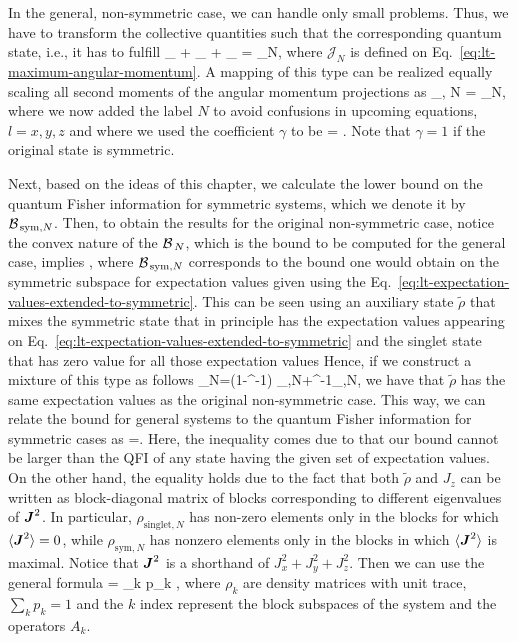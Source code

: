 In the general, non-symmetric case, we can handle only small problems.
Thus, we have to transform the collective quantities such that the corresponding quantum state, i.e., it has to fulfill
\be
  _{} + _{} + _{} = _N,
\ee
where $\mathcal{J}_{N}$ is defined on Eq.~\eqref{eq:lt-maximum-angular-momentum}.
A mapping of this type can be realized equally scaling all second moments of the angular momentum projections as
\be
  \label{eq:lt-expectation-values-extended-to-symmetric}
  _{, N} = \gamma {}_N,
\ee
where we now added the label $N$ to avoid confusions in upcoming equations, $l=x,y,z$ and where we used the coefficient $\gamma$ to be
\be
  \label{eq:lt-value-of-gamma}
  \gamma = .
\ee
Note that $\gamma=1$ if the original state is symmetric.

Next, based on the ideas of this chapter, we calculate the lower bound on the quantum Fisher information for symmetric systems, which we denote it by $\mathcal{B}_{\, \text{sym},N }$.
Then, to obtain the results for the original non-symmetric case, notice the convex nature of the $\mathcal{B}_{\, N }$, which is the bound to be computed for the general case, implies
\be
  \leq {},
\ee
where $\mathcal{B}_{\, \text{sym},N }$ corresponds to the bound one would obtain on the symmetric subspace for expectation values given using the Eq.~\eqref{eq:lt-expectation-values-extended-to-symmetric}.
This can be seen using an auxiliary state $\tilde{\rho}$ that mixes the symmetric state that in principle has the expectation values appearing on Eq.~\eqref{eq:lt-expectation-values-extended-to-symmetric} and the singlet state that has zero value for all those expectation values
Hence, if we construct a mixture of this type as follows
\be
  \tilde{\rho}_N=(1-\gamma^{-1}) \rho_{,N}+\gamma^{-1}\rho_{,N},
\ee
we have that $\tilde{\rho}$ has the same expectation values as the original non-symmetric case.
This way, we can relate the bound for general systems to the quantum Fisher information for symmetric cases as
\be
  \label{eq:lt-radial-linearity-dicke-bound}
  \leq {}=.
\ee
Here, the inequality comes due to that our bound cannot be larger than the QFI of any state having the given set of expectation values.
On the other hand, the equality holds due to the fact that both $\tilde{\rho}$ and $J_z$ can be written as block-diagonal matrix of blocks corresponding to different eigenvalues of $\boldsymbol{J}^2$.
In particular, $\rho_{\text{singlet},N}$ has non-zero elements only in the blocks for which $\langle \boldsymbol{J}^2 \rangle=0$, while $\rho_{\text{sym},N}$ has nonzero elements only in the blocks in which $\langle \boldsymbol{J}^2 \rangle$ is maximal.
Notice that $\boldsymbol{J}^2$ is a shorthand of $J_x^2+J_y^2+J_z^2$.
Then we can use the general formula \citep{Toth2014}
\be
  = \sum_k p_k \qfi[\rho_k,A_k],
\ee
where $\rho_k$ are density matrices with unit trace, $\sum_k p_k=1$ and the $k$ index represent the block subspaces of the system and the operators $A_k$.

